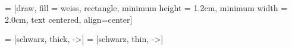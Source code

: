 

 = [draw,
                         fill           = weiss,
                         rectangle,
                         minimum height = 1.2cm,
                         minimum width  = 2.0cm,
                         text centered,
                         align=center]


    = [schwarz, thick, ->]
 = [schwarz, thin, ->]
